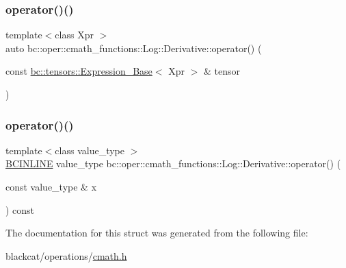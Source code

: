 \mbox{\label{structbc_1_1oper_1_1cmath__functions_1_1Log_1_1Derivative_a25c7f3e1f0343d4bd510de5deb4243cb}} 
\subsubsection{\texorpdfstring{operator()()}{operator()()}\hspace{0.1cm}{\footnotesize\ttfamily [2/3]}}
{\footnotesize\ttfamily template$<$class Xpr $>$ \\
auto bc\+::oper\+::cmath\+\_\+functions\+::\+Log\+::\+Derivative\+::operator() (\begin{DoxyParamCaption}\item[{const \hyperlink{classbc_1_1tensors_1_1Expression__Base}{bc\+::tensors\+::\+Expression\+\_\+\+Base}$<$ Xpr $>$ \&}]{tensor }\end{DoxyParamCaption})\hspace{0.3cm}{\ttfamily [inline]}}

\mbox{\label{structbc_1_1oper_1_1cmath__functions_1_1Log_1_1Derivative_ab7b29a662723175f581562b726584f92}} 
\subsubsection{\texorpdfstring{operator()()}{operator()()}\hspace{0.1cm}{\footnotesize\ttfamily [3/3]}}
{\footnotesize\ttfamily template$<$class value\+\_\+type $>$ \\
\hyperlink{common_8h_a6699e8b0449da5c0fafb878e59c1d4b1}{B\+C\+I\+N\+L\+I\+NE} value\+\_\+type bc\+::oper\+::cmath\+\_\+functions\+::\+Log\+::\+Derivative\+::operator() (\begin{DoxyParamCaption}\item[{const value\+\_\+type \&}]{x }\end{DoxyParamCaption}) const\hspace{0.3cm}{\ttfamily [inline]}}



The documentation for this struct was generated from the following file\+:\begin{DoxyCompactItemize}
\item 
blackcat/operations/\hyperlink{cmath_8h}{cmath.\+h}\end{DoxyCompactItemize}
